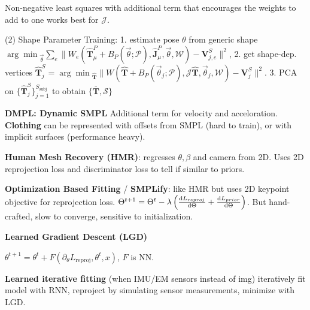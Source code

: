 Non-negative least squares with additional term that encourages the weights to add to one works best for \(\mathcal{J}\).

(2) Shape Parameter Training: 1. estimate pose \(\theta\) from generic shape \({\arg \min}_{{\vec{\theta}}} \sum_{e}\|W_{e}(\hat{\mathbf{T}}_{\mu}^{P}+B_{P}(\vec{\theta} ; \mathcal{P}), \hat{\mathbf{J}}_{\mu}^{P}, \vec{\theta}, \mathcal{W})-\mathbf{V}_{j, e}^{S}\|^{2}\),
2. get shape-dep. vertices \(\hat{\mathbf{T}}_{j}^{S}={\arg \min }_{\hat{\mathbf{T}}} \|W(\hat{\mathbf{T}}+B_{P}(\vec{\theta}_{j} ; \mathcal{P}), \mathcal{J} \hat{\mathbf{T}}, \vec{\theta}_{j}, \mathcal{W})-\mathbf{V}_{j}^{S}\|^{2}\).
3. PCA on \(\{\hat{\mathbf{T}}_{j}^{S}\}_{j=1}^{S_{\text {subj }}}\) to obtain \(\{\overline{\mathbf{T}}, \mathcal{S}\}\)

\textbf{DMPL: Dynamic SMPL} Additional term for velocity and acceloration. \textbf{Clothing} can be represented with offsets from SMPL (hard to train), or with implicit surfaces (performance heavy).

\textbf{Human Mesh Recovery (HMR)}: regresses $\theta, \beta$ and camera from 2D. Uses 2D reprojection loss and discriminator loss to tell if similar to priors.

\textbf{Optimization Based Fitting} / \textbf{SMPLify}: like HMR but uses 2D keypoint objective for reprojection loss. \(\Theta^{t+1} = \Theta^t - \lambda\left(\derivative{L_{reproj}}{\Theta} + \derivative{L_{prior}}{\Theta}\right)\). But hand-crafted, slow to converge, sensitive to initialization.

\textbf{Learned Gradient Descent (LGD)}

\(\theta^{t+1}=\theta^{t}+F(\partial_{\theta} L_{\text {reproj}}, \theta^{t}, x)\), \(F\) is NN.

\textbf{Learned iterative fitting} (when IMU/EM sensors instead of img) iteratively fit model with RNN, reproject by simulating sensor measurements, minimize with LGD.



